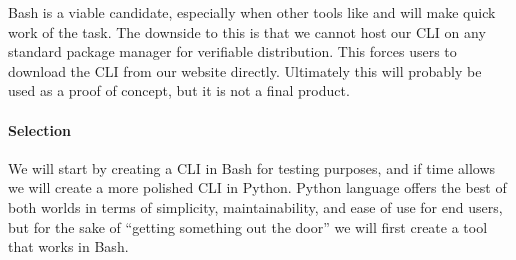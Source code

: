 Bash is a viable candidate, especially when other tools like  and  will make quick work of the task.
The downside to this is that we cannot host our CLI on any standard package manager for verifiable distribution.
This forces users to download the CLI from our website directly.
Ultimately this will probably be used as a proof of concept, but it is not a final product.

\paragraph{Selection}

We will start by creating a CLI in Bash for testing purposes, and if time allows we will create a more polished CLI in Python.
Python language offers the best of both worlds in terms of simplicity, maintainability, and ease of use for end users, but for the sake of ``getting something out the door'' we will first create a tool that works in Bash.
